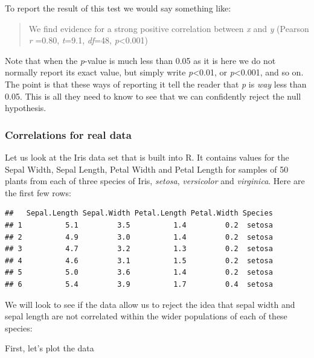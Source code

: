 \documentclass[
]{article}
\begin{document}
To report the result of this test we would say something like:

\begin{quote}
We find evidence for a strong positive correlation between \emph{x} and
\emph{y} (Pearson \emph{r} =0.80, \emph{t}=9.1, \emph{df}=48,
\emph{p}\textless0.001)
\end{quote}

Note that when the \emph{p}-value is much less than 0.05 as it is here
we do not normally report its exact value, but simply write
\emph{p}\textless0.01, or \emph{p}\textless0.001, and so on. The point
is that these ways of reporting it tell the reader that \emph{p} is
\emph{way} less than 0.05. This is all they need to know to see that we
can confidently reject the null hypothesis.

\subsubsection{Correlations for real
data}\label{correlations-for-real-data}

Let us look at the Iris data set that is built into R. It contains
values for the Sepal Width, Sepal Length, Petal Width and Petal Length
for samples of 50 plants from each of three species of Iris,
\emph{setosa}, \emph{versicolor} and \emph{virginica}. Here are the
first few rows:

\begin{verbatim}
##   Sepal.Length Sepal.Width Petal.Length Petal.Width Species
## 1          5.1         3.5          1.4         0.2  setosa
## 2          4.9         3.0          1.4         0.2  setosa
## 3          4.7         3.2          1.3         0.2  setosa
## 4          4.6         3.1          1.5         0.2  setosa
## 5          5.0         3.6          1.4         0.2  setosa
## 6          5.4         3.9          1.7         0.4  setosa
\end{verbatim}

We will look to see if the data allow us to reject the idea that sepal
width and sepal length are not correlated within the wider populations
of each of these species:

First, let's plot the data
\end{document}

